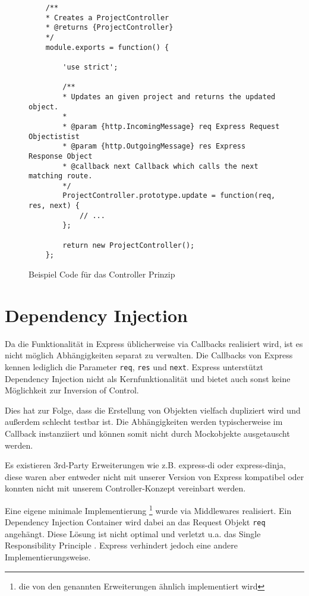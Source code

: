 \begin{figure}[h]
	\centering
	\begin{lstlisting}
	/**
	* Creates a ProjectController
	* @returns {ProjectController}
	*/
	module.exports = function() {
	
		'use strict';
		
		/**
		* Updates an given project and returns the updated object.
		*
		* @param {http.IncomingMessage} req Express Request Objectistist
		* @param {http.OutgoingMessage} res Express Response Object
		* @callback next Callback which calls the next matching route.
		*/
		ProjectController.prototype.update = function(req, res, next) {
			// ...
		};
		
		return new ProjectController();
	};
	\end{lstlisting}
	\caption[controller]{Beispiel Code für das Controller Prinzip}
	\label{f:controller}
\end{figure}

\section{Dependency Injection}\label{dependency-injection}

Da die Funktionalität in Express üblicherweise\cite{express-routing}
via Callbacks realisiert wird, ist es nicht möglich Abhängigkeiten
separat zu verwalten. Die Callbacks von Express kennen lediglich die
Parameter \texttt{req}, \texttt{res} und \texttt{next}. Express
unterstützt Dependency Injection nicht als Kernfunktionalität und bietet
auch sonst keine Möglichkeit zur Inversion of Control.

Dies hat zur Folge, dass die Erstellung von Objekten vielfach dupliziert
wird und außerdem schlecht testbar ist. Die Abhängigkeiten werden
typischerweise im Callback instanziiert und können somit nicht durch
Mockobjekte ausgetauscht werden.

Es existieren 3rd-Party Erweiterungen wie z.B. express-di\cite{express-di} oder
express-dinja\cite{express-dinja}, diese
waren aber entweder nicht mit unserer Version von Express kompatibel
oder konnten nicht mit unserem Controller-Konzept vereinbart werden.

Eine eigene minimale Implementierung \footnote{die von den genannten
Erweiterungen ähnlich implementiert wird} wurde via Middlewares
realisiert. Ein Dependency Injection Container wird dabei an das Request
Objekt \texttt{req} angehängt. Diese Lösung ist nicht optimal und
verletzt u.a. das Single Responsibility Principle
\cite{srp}. Express verhindert jedoch eine
andere Implementierungsweise.

